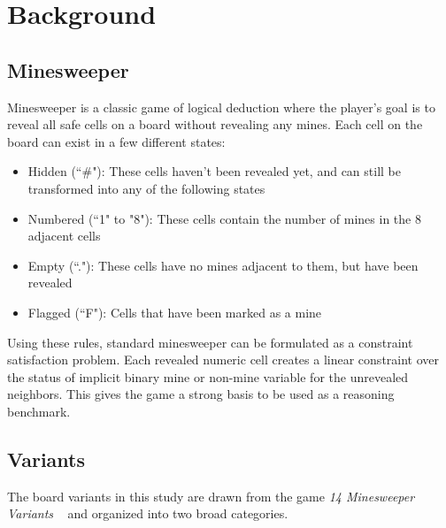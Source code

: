 \documentclass[11pt,conference,compsoc]{IEEEtran}
\begin{document}
\section{Background}

\subsection{Minesweeper}
Minesweeper is a classic game of logical deduction where the player's goal is to reveal all safe cells on a board without revealing any mines. Each cell on the board can exist in a few different states:
\begin{itemize}
    \item Hidden (``\#"): These cells haven't been revealed yet, and can still be transformed into any of the following states
    \item Numbered (``1" to "8"): These cells contain the number of mines in the 8 adjacent cells
    \item Empty (``."): These cells have no mines adjacent to them, but have been revealed
    \item Flagged (``F"): Cells that have been marked as a mine

\end{itemize}
Using these rules, standard minesweeper can be formulated as a constraint satisfaction problem\cite{studholme2001minesweeper}. Each revealed numeric cell creates a linear constraint over the status of implicit binary mine or non-mine variable for the unrevealed neighbors. This gives the game a strong basis to be used as a reasoning benchmark.
\subsection{Variants}
The board variants in this study are drawn from the game \textit{14 Minesweeper
Variants} ~\cite{artlessgames2022minesweeper} and organized into two broad categories.
\end{document}
